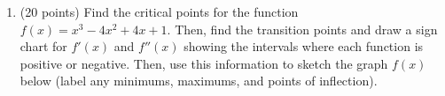\documentclass[11pt]{article}
\begin{document}
\begin{enumerate}
\item (20 points) Find the critical points for the function $f(x) = x^3 - 4x^2 +4x+1$. Then, find the transition points and draw a sign chart for $f'(x)$ and $f''(x)$ showing the intervals where each function is positive or negative. Then, use this information to sketch the graph $f(x)$ below (label any minimums, maximums, and points of inflection).
\\

\vspace{60 mm}

\vspace{10pt}
\begin{center}
\end{center}


\end{enumerate}
\end{document}
